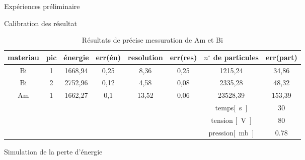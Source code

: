 \documentclass[a4paper,11pt]{scrartcl}
\begin{document}
\begin{section}{Expériences préliminaire}
  \begin{subsection}{Calibration des résultat}
   \begin{table}[htbp]
\caption{Résultats de précise messuration de Am et Bi}
\begin{center}
\begin{tabular}{|c||c|c|c|c|c|c|c|}
\hline 
materiau	&	pic	&	énergie	&	err(én)	&	resolution	&	err(res)	&	$n^{\circ}$ de particules	&	err(part)	\\ \hline\hline
Bi	&	1	&	1668,94	&	0,25	&	8,36	&	0,25	&	1215,24	&	34,86	\\ \hline
Bi	&	2	&	2752,96	&	0,12	&	4,58	&	0,08	&	2335,28	&	48,32	\\ \hline
Am	&	1	&	1662,27	&	0,1	&	13,52	&	0,06	&	23528,39	&	153,39	\\ \hline\hline
\hline
\multicolumn{ 6}{|c|}{} & temps\unit{[s]} & 30 \\ \cline{ 7- 8}
\multicolumn{6}{|c|}{} & tension \unit{[V]}& 80 \\ \cline{7-8}
\multicolumn{ 6}{|c|}{} & pression\unit{[mb]}& 0.78 \\ \hline
\end{tabular}
\end{center}
\end{table}
  \end{subsection}
  
  \begin{subsection}{Simulation de la perte d'énergie}
   
  \end{subsection}
 \end{section}
\end{document}
